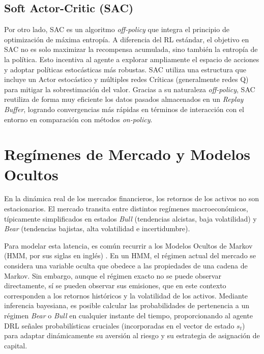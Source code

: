 \subsection{Soft Actor-Critic (SAC)}
Por otro lado, SAC \citep{haarnoja2018soft} es un algoritmo \textit{off-policy} que integra el principio de optimización de máxima entropía. A diferencia del RL estándar, el objetivo en SAC no es solo maximizar la recompensa acumulada, sino también la entropía de la política. Esto incentiva al agente a explorar ampliamente el espacio de acciones y adoptar políticas estocásticas más robustas. SAC utiliza una estructura que incluye un Actor estocástico y múltiples redes Críticas (generalmente redes Q) para mitigar la sobrestimación del valor. Gracias a su naturaleza \textit{off-policy}, SAC reutiliza de forma muy eficiente los datos pasados almacenados en un \textit{Replay Buffer}, logrando convergencias más rápidas en términos de interacción con el entorno en comparación con métodos \textit{on-policy}.

\section{Regímenes de Mercado y Modelos Ocultos}
En la dinámica real de los mercados financieros, los retornos de los activos no son estacionarios. El mercado transita entre distintos regímenes macroeconómicos, típicamente simplificados en estados \textit{Bull} (tendencias alcistas, baja volatilidad) y \textit{Bear} (tendencias bajistas, alta volatilidad e incertidumbre).

Para modelar esta latencia, es común recurrir a los Modelos Ocultos de Markov (HMM, por sus siglas en inglés) \citep{baum1966statistical}. En un HMM, el régimen actual del mercado se considera una variable oculta que obedece a las propiedades de una cadena de Markov. Sin embargo, aunque el régimen exacto no se puede observar directamente, sí se pueden observar sus emisiones, que en este contexto corresponden a los retornos históricos y la volatilidad de los activos. Mediante inferencia bayesiana, es posible calcular las probabilidades de pertenencia a un régimen \textit{Bear} o \textit{Bull} en cualquier instante del tiempo, proporcionando al agente DRL señales probabilísticas cruciales (incorporadas en el vector de estado $s_t$) para adaptar dinámicamente su aversión al riesgo y su estrategia de asignación de capital.
